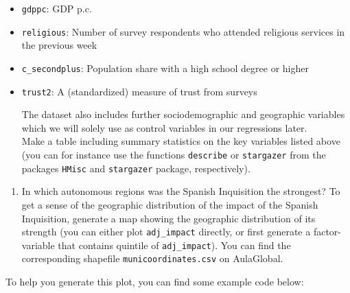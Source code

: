 \documentclass[
]{report}
\providecommand{\tightlist}{%
  \setlength{\itemsep}{0pt}\setlength{\parskip}{0pt}}\usepackage{longtable,booktabs,array}
\begin{document}
\begin{itemize}
\item
  \texttt{gdppc}: GDP p.c.
\item
  \texttt{religious}: Number of survey respondents who attended
  religious services in the previous week
\item
  \texttt{c\_secondplus}: Population share with a high school degree or
  higher
\item
  \texttt{trust2}: A (standardized) measure of trust from surveys

  The dataset also includes further sociodemographic and geographic
  variables which we will solely use as control variables in our
  regressions later.\\
  Make a table including summary statistics on the key variables listed
  above (you can for instance use the functions \texttt{describe} or
  \texttt{stargazer} from the packages \texttt{HMisc} and
  \texttt{stargazer} package, respectively).
\end{itemize}

\begin{enumerate}
\def\labelenumi{\arabic{enumi}.}
\setcounter{enumi}{1}
\tightlist
\item
  In which autonomous regions was the Spanish Inquisition the strongest?
  To get a sense of the geographic distribution of the impact of the
  Spanish Inquisition, generate a map showing the geographic
  distribution of its strength (you can either plot \texttt{adj\_impact}
  directly, or first generate a factor-variable that contains quintile
  of \texttt{adj\_impact}). You can find the corresponding shapefile
  \texttt{municoordinates.csv} on AulaGlobal.
\end{enumerate}

To help you generate this plot, you can find some example code below:
\end{document}
